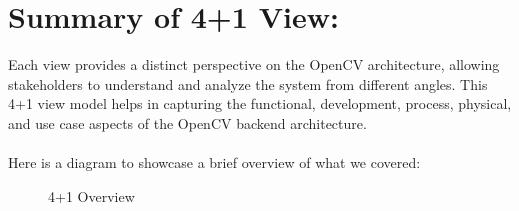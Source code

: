 \section{Summary of 4+1 View:\label{Section::Overview}}
Each view provides a distinct perspective on the OpenCV architecture, allowing stakeholders to understand and analyze the system from different angles. This 4+1 view model helps in capturing the functional, development, process, physical, and use case aspects of the OpenCV backend architecture.\\\\ 
Here is a diagram to showcase a brief overview of what we covered:

\begin{figure}[H]
     \centering
     \caption{\label{Figure::BriefOverview} 4+1 Overview}
\end{figure}
